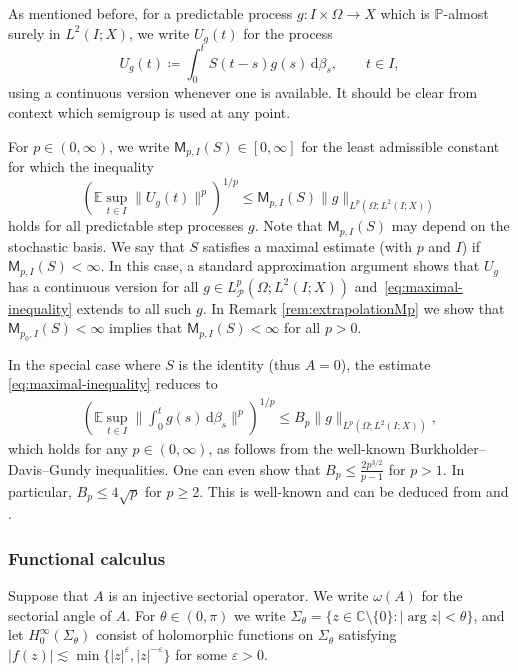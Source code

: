 \documentclass[11pt]{amsart}
\theoremstyle{definition}
\theoremstyle{remark}
\numberwithin{equation}{section}
\newcommand{\C}{\mathbb C}
\newcommand{\E}{\mathbb E}
\renewcommand{\P}{\mathbb P}
\newcommand{\cP}{\mathcal P}
\newcommand{\1}{\mathbf 1}
\newcommand{\cM}{\mathsf{M}}
\newcommand{\norm}[1]{\lVert #1\rVert}
\newcommand{\dd}{\,\mathrm d}
\newcommand{\Sigmaa}[1]{\Sigma_{#1}}
\begin{document}
As mentioned before, for a predictable process $g : I \times \Omega \to X$ which is $\P$-almost surely in $L^2(I;X)$, we write $U_g(t)$ for the process
\begin{equation}
    U_g(t) \coloneq \int_0^t S(t-s)g(s) \dd \beta_s, \qquad t \in I,
\end{equation}
using a continuous version whenever one is available.
It should be clear from context which semigroup is used at any point.

For $p \in (0,\infty)$, we write $\cM_{p,I}(S) \in [0,\infty]$ for the least admissible constant for which the inequality
\begin{equation}
 \left(\E\sup_{t\in I}\norm{U_g(t)}^p\right)^{1/p}
 \leq \cM_{p,I}(S)
 \norm{g}_{L^p(\Omega;L^2(I;X))}
 \label{eq:maximal-inequality}
\end{equation}
holds for all predictable step processes $g$.
Note that $\cM_{p,I}(S)$ may depend on the stochastic basis.
We say that $S$ satisfies a maximal estimate (with $p$ and $I$) if $\cM_{p,I}(S) < \infty$.
In this case, a standard approximation argument shows that $U_g$ has a continuous version for all $g \in L^p_{\cP}(\Omega;L^2(I;X))$ and~\eqref{eq:maximal-inequality} extends to all such $g$. In Remark \ref{rem:extrapolationMp} we show that $\cM_{p_0,I}(S) < \infty$ implies that $\cM_{p,I}(S) < \infty$ for all $p>0$. 


In the special case where $S$ is the identity (thus $A=0$), the estimate \eqref{eq:maximal-inequality} reduces to 
\begin{align}
    \left(\E\sup_{t\in I}\norm{\int_0^t g(s) \dd \beta_s}^p\right)^{1/p} \leq B_p \norm{g}_{L^p(\Omega;L^2(I;X))},
 \label{eq:BDG}
\end{align}
which holds for any $p\in (0,\infty)$, as follows from the well-known Burkholder--Davis--Gundy inequalities. 
One can even show that $B_p\leq \frac{2p^{3/2}}{p-1}$ for $p>1$. In particular, $B_p \leq 4\sqrt{p}$ for $p\geq 2$. This is well-known and can be deduced from \cite[Theorem A]{CarlenKree} and \cite[Lemma A.2]{VeraarWeis2011}.


\subsubsection{Functional calculus}
Suppose that $A$ is an injective sectorial operator. We write $\omega(A)$ for the sectorial angle of $A$. For $\theta \in (0,\pi)$ we write $\Sigmaa{\theta}=\{z\in\C\setminus\{0\}:|\arg z|<\theta\}$, and let $H_0^\infty(\Sigmaa{\theta})$ consist of holomorphic functions on $\Sigma_{\theta}$ satisfying $|f(z)|\lesssim\min\{|z|^\varepsilon,|z|^{-\varepsilon}\}$
for some $\varepsilon>0$.
\end{document}
